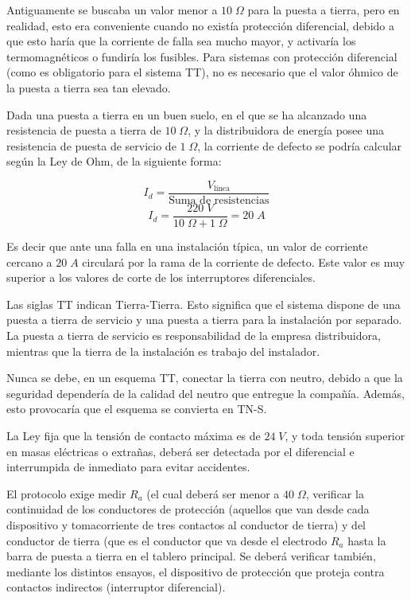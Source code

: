 Antiguamente se buscaba un valor menor a $10\; \Omega$ para la puesta a tierra, pero en realidad, esto era conveniente cuando no existía protección diferencial, debido a que esto haría que la corriente de falla sea mucho mayor, y activaría los termomagnéticos o fundiría los fusibles. Para sistemas con protección diferencial (como es obligatorio para el sistema TT), no es necesario que el valor óhmico de la puesta a tierra sea tan elevado.

\begin{ejemplo}
	Dada una puesta a tierra en un buen suelo, en el que se ha alcanzado una resistencia de puesta a tierra de $10\; \Omega$, y la distribuidora de energía posee una resistencia de puesta de servicio de $1\; \Omega$, la corriente de defecto se podría calcular según la Ley de Ohm, de la siguiente forma:
	
	$$I_d= \frac{V_{\text{línea}}}{\text{Suma de resistencias}}$$
	$$I_d = \frac{220\; V}{10\; \Omega + 1\; \Omega}=20\; A $$

	Es decir que ante una falla en una instalación típica, un valor de corriente cercano a $20\; A$ circulará por la rama de la corriente de defecto. Este valor es muy superior a los valores de corte de los interruptores diferenciales.
\end{ejemplo}

Las siglas TT indican Tierra-Tierra. Esto significa que el sistema dispone de una puesta a tierra de servicio y una puesta a tierra para la instalación por separado. La puesta a tierra de servicio es responsabilidad de la empresa distribuidora, mientras que la tierra de la instalación es trabajo del instalador.

Nunca se debe, en un esquema TT, conectar la tierra con neutro, debido a que la seguridad dependería de la calidad del neutro que entregue la compañía. Además, esto provocaría que el esquema se convierta en TN-S.

La Ley fija que la tensión de contacto máxima es de $24\; V$, y toda tensión superior en masas eléctricas o extrañas, deberá ser detectada por el diferencial e interrumpida de inmediato para evitar accidentes.

El protocolo exige medir $R_a$ (el cual deberá ser menor a $40\; \Omega$, verificar la continuidad de los conductores de protección (aquellos que van desde cada dispositivo y tomacorriente de tres contactos al conductor de tierra) y del conductor de tierra (que es el conductor que va desde el electrodo $R_a$ hasta la barra de puesta a tierra en el tablero principal. Se deberá verificar también, mediante los distintos ensayos, el dispositivo de protección que proteja contra contactos indirectos (interruptor diferencial). 

